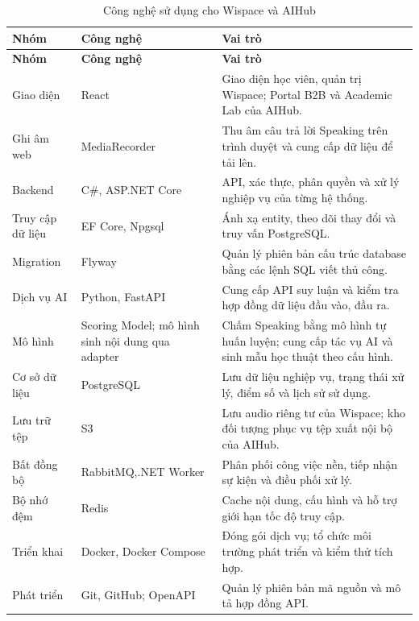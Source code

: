 \begingroup
\small{}
\renewcommand{\arraystretch}{1.2}
\begin{longtable}{|>{\raggedright\arraybackslash}p{}|>{\raggedright\arraybackslash}p{}|>{\raggedright\arraybackslash}p{}|}
\caption{Công nghệ sử dụng cho Wispace và AIHub}\label{tech:tab:stack}\\\hline
\textbf{Nhóm} & \textbf{Công nghệ} & \textbf{Vai trò} \\ \hline
\endfirsthead
\hline
\textbf{Nhóm} & \textbf{Công nghệ} & \textbf{Vai trò} \\ \hline
\endhead
Giao diện & React & Giao diện học viên, quản trị Wispace; Portal B2B và Academic Lab của AIHub. \\ \hline
Ghi âm web & MediaRecorder & Thu âm câu trả lời Speaking trên trình duyệt và cung cấp dữ liệu để tải lên. \\ \hline
Backend & C\#, ASP.NET Core & API, xác thực, phân quyền và xử lý nghiệp vụ của từng hệ thống. \\ \hline
Truy cập dữ liệu & EF Core, Npgsql & Ánh xạ entity, theo dõi thay đổi và truy vấn PostgreSQL. \\ \hline
Migration & Flyway & Quản lý phiên bản cấu trúc database bằng các lệnh SQL viết thủ công. \\ \hline
Dịch vụ AI & Python, FastAPI & Cung cấp API suy luận và kiểm tra hợp đồng dữ liệu đầu vào, đầu ra. \\ \hline
Mô hình & Scoring Model; mô hình sinh nội dung qua adapter & Chấm Speaking bằng mô hình tự huấn luyện; cung cấp tác vụ AI và sinh mẫu học thuật theo cấu hình. \\ \hline
Cơ sở dữ liệu & PostgreSQL & Lưu dữ liệu nghiệp vụ, trạng thái xử lý, điểm số và lịch sử sử dụng. \\ \hline
Lưu trữ tệp & S3 & Lưu audio riêng tư của Wispace; kho đối tượng phục vụ tệp xuất nội bộ của AIHub. \\ \hline
Bất đồng bộ & RabbitMQ,.NET Worker & Phân phối công việc nền, tiếp nhận sự kiện và điều phối xử lý. \\ \hline
Bộ nhớ đệm & Redis & Cache nội dung, cấu hình và hỗ trợ giới hạn tốc độ truy cập. \\ \hline
Triển khai & Docker, Docker Compose & Đóng gói dịch vụ; tổ chức môi trường phát triển và kiểm thử tích hợp. \\ \hline
Phát triển & Git, GitHub; OpenAPI & Quản lý phiên bản mã nguồn và mô tả hợp đồng API. \\ \hline
\end{longtable}
\endgroup

